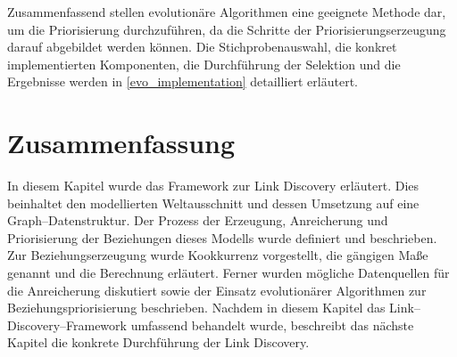Zusammenfassend stellen evolutionäre Algorithmen eine geeignete Methode dar, um die Priorisierung durchzuführen, da die Schritte der Priorisierungserzeugung darauf abgebildet werden können. Die Stichprobenauswahl, die konkret implementierten Komponenten, die Durchführung der Selektion und die Ergebnisse werden in \cref{evo_implementation} detailliert erläutert.

\section{Zusammenfassung}

In diesem Kapitel wurde das Framework zur Link Discovery erläutert. Dies beinhaltet den modellierten Weltausschnitt und dessen Umsetzung auf eine Graph--Datenstruktur. Der Prozess der Erzeugung, Anreicherung und Priorisierung der Beziehungen dieses Modells wurde definiert und beschrieben. Zur Beziehungserzeugung wurde Kookkurrenz vorgestellt, die gängigen Maße genannt und die Berechnung erläutert. Ferner wurden mögliche Datenquellen für die Anreicherung diskutiert sowie der Einsatz evolutionärer Algorithmen zur Beziehungspriorisierung beschrieben. Nachdem in diesem Kapitel das Link--Discovery--Framework umfassend behandelt wurde, beschreibt das nächste Kapitel die konkrete Durchführung der Link Discovery.
